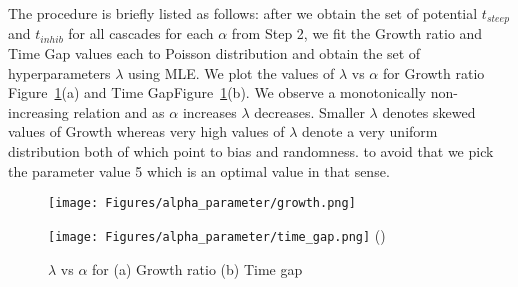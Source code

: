 \documentclass[smallextended]{svjour3}       %
\theoremstyle{definition}
\begin{document}
The procedure is briefly listed as follows: after we obtain the set of potential $t_{steep}$ and $t_{inhib}$ for all cascades for each $\alpha$ from Step 2, we fit the Growth ratio and Time Gap values each to Poisson distribution and obtain the set of hyperparameters $\lambda$ using MLE. We plot the values of $\lambda$ vs $\alpha$ for Growth ratio Figure~\ref{fig:parm_sens}(a) and Time GapFigure~\ref{fig:parm_sens}(b). We observe a monotonically non-increasing relation and as $\alpha $ increases $\lambda$ decreases. Smaller $\lambda$ denotes skewed values of Growth whereas very high values of $\lambda $ denote a very uniform distribution both of which point to bias and randomness. to avoid that we pick the parameter value 5 which is an optimal value in that sense. 

\begin{figure}[H]
	\begin{minipage}{0.3\textwidth}
		\texttt{[image: Figures/alpha\_parameter/growth.png]}
		\hspace*{2cm}\subcaption{}
	\end{minipage}
	\hspace{3cm}
	\begin{minipage}{0.3\textwidth}
		\texttt{[image: Figures/alpha\_parameter/time\_gap.png]}
		\hspace*{2cm}\subcaption()
	\end{minipage}
	\caption{$\lambda$ vs $\alpha$ for (a) Growth ratio  (b) Time gap}
	\label{fig:parm_sens}
\end{figure}



\end{document}
